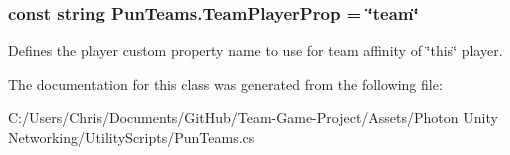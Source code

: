 \subsubsection[{\texorpdfstring{Team\+Player\+Prop}{TeamPlayerProp}}]{\setlength{\rightskip}{0pt plus 5cm}const string Pun\+Teams.\+Team\+Player\+Prop = \char`\"{}team\char`\"{}}\hypertarget{class_pun_teams_a036c6f1b595a3a4d3df5dc6566950667}{}\label{class_pun_teams_a036c6f1b595a3a4d3df5dc6566950667}


Defines the player custom property name to use for team affinity of \char`\"{}this\char`\"{} player.



The documentation for this class was generated from the following file\+:\begin{DoxyCompactItemize}
\item 
C\+:/\+Users/\+Chris/\+Documents/\+Git\+Hub/\+Team-\/\+Game-\/\+Project/\+Assets/\+Photon Unity Networking/\+Utility\+Scripts/Pun\+Teams.\+cs\end{DoxyCompactItemize}
